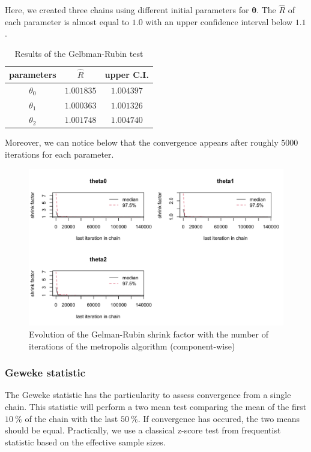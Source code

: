 Here, we created three chains using different initial parameters for $\bm{\theta}$. The $\hat{R}$ of each parameter is almost equal to $1.0$ with an upper confidence interval below $1.1$.

\begin{table}[H]
	\centering\begin{tabular}{|c|c|c|} \hline 
		parameters & $\hat{R}$ & upper C.I. \\ \hline
		$\theta_0$ & $1.001835$ & $1.004397$ \\
		$\theta_1$ & $1.000363$ & $1.001326$ \\
		$\theta_2$ & $1.001748$ & $1.004740$ \\ \hline
	\end{tabular}
	\caption{Results of the Gelbman-Rubin test}
	\label{tab:metropolis-cw-gelman-rubin}
\end{table}

Moreover, we can notice below that the convergence appears after roughly $5000$ iterations for each parameter.

\begin{figure}[H]
	\centering
	\includegraphics{figures/metropolis_cw_gelman-plot.png}
	\caption{Evolution of the Gelman-Rubin shrink factor with the number of iterations of the metropolis algorithm (component-wise)}
	\label{<label>}
\end{figure}

\subsubsection*{Geweke statistic}

The Geweke statistic has the particularity to assess convergence from a single chain. This statistic will perform a two mean test comparing the mean of the first $\SI{10}{\percent}$ of the chain with the last $\SI{50}{\percent}$. If convergence has occured, the two means should be equal. Practically, we use a classical z-score test from frequentist statistic based on the effective sample sizes.

